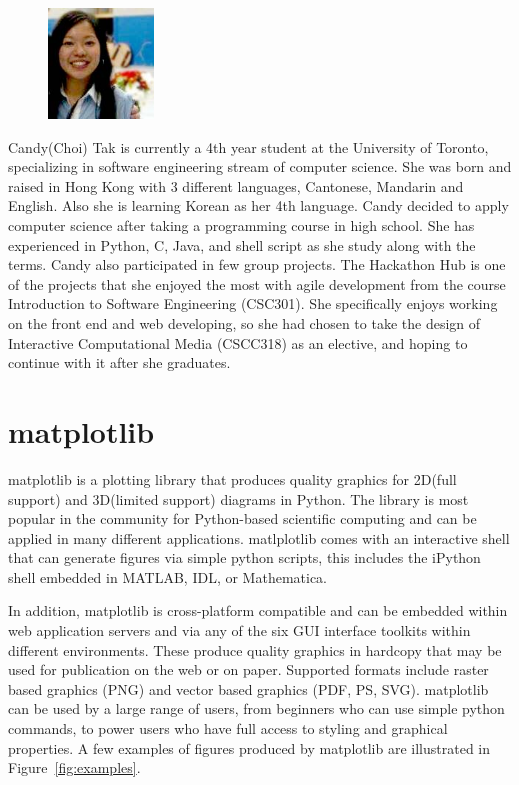 \documentclass[pdftex,10pt,a4paper]{report}
\begin{document}
\begin{figure}
  \vspace{-20pt}
  \begin{center}
    \includegraphics[width=0.25\textwidth]{img/group/candy.jpg}
  \end{center}
  \vspace{-20pt}
\end{figure}
Candy(Choi) Tak is currently a 4th year student at the University of Toronto, specializing in software engineering stream of computer science. She was born and raised in Hong Kong with 3 different languages, Cantonese, Mandarin and English. Also she is learning Korean as her 4th language. Candy decided to apply computer science after taking a programming course in high school.  She has experienced in Python, C, Java, and shell script as she study along with the terms. Candy also participated in few group projects. The Hackathon Hub is one of the projects that she enjoyed the most with agile development from the course Introduction to Software Engineering (CSC301). She specifically enjoys working on the front end and web developing, so she had chosen to take the design of Interactive Computational Media (CSCC318) as an elective, and hoping to continue with it after she graduates.\\

\section{matplotlib}

matplotlib is a plotting library that produces quality graphics for 2D(full support) and 3D(limited support) diagrams in Python. The library is most popular in the community for Python-based scientific computing  and can be applied in many different applications. matlplotlib comes with an interactive shell that can generate figures via simple python scripts, this includes the iPython shell embedded in MATLAB, IDL, or Mathematica. 

In addition, matplotlib is cross-platform compatible and can be embedded within web application servers and via any of the six GUI interface toolkits within different environments. These produce quality graphics in hardcopy that may be used for publication on the web or on paper. Supported formats include raster based graphics (PNG) and vector based graphics (PDF, PS, SVG). matplotlib can be used by a large range of users, from beginners who can use simple python commands, to power users who have full access to styling and graphical properties. A few examples of figures produced by matplotlib are illustrated in Figure~\ref{fig:examples}.
\end{document}
